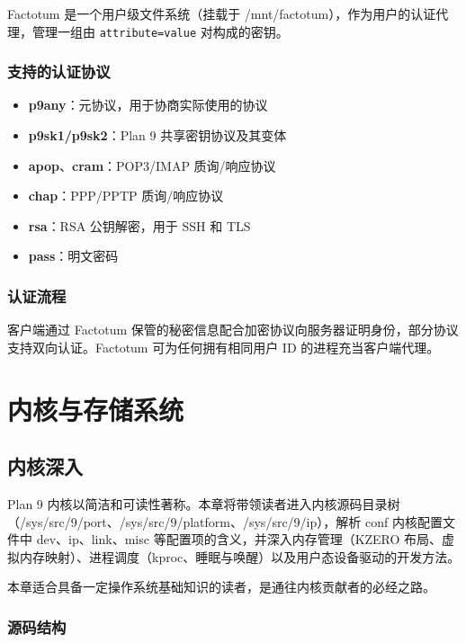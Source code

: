 \documentclass[12pt,UTF8]{ctexbook}
\begin{document}
Factotum 是一个用户级文件系统（挂载于 /mnt/factotum），作为用户的认证代理，管理一组由 \texttt{attribute=value} 对构成的密钥。

\section{支持的认证协议}

\begin{itemize}
	\item \textbf{p9any}：元协议，用于协商实际使用的协议
	\item \textbf{p9sk1/p9sk2}：Plan 9 共享密钥协议及其变体
	\item \textbf{apop}、\textbf{cram}：POP3/IMAP 质询/响应协议
	\item \textbf{chap}：PPP/PPTP 质询/响应协议
	\item \textbf{rsa}：RSA 公钥解密，用于 SSH 和 TLS
	\item \textbf{pass}：明文密码
\end{itemize}

\section{认证流程}

客户端通过 Factotum 保管的秘密信息配合加密协议向服务器证明身份，部分协议支持双向认证。Factotum 可为任何拥有相同用户 ID 的进程充当客户端代理。


\part{内核与存储系统}

\chapter{内核深入}

Plan 9 内核以简洁和可读性著称。本章将带领读者进入内核源码目录树（/sys/src/9/port、/sys/src/9/platform、/sys/src/9/ip），解析 conf 内核配置文件中 dev、ip、link、misc 等配置项的含义，并深入内存管理（KZERO 布局、虚拟内存映射）、进程调度（kproc、睡眠与唤醒）以及用户态设备驱动的开发方法。

本章适合具备一定操作系统基础知识的读者，是通往内核贡献者的必经之路。

\section{源码结构}
\end{document}

